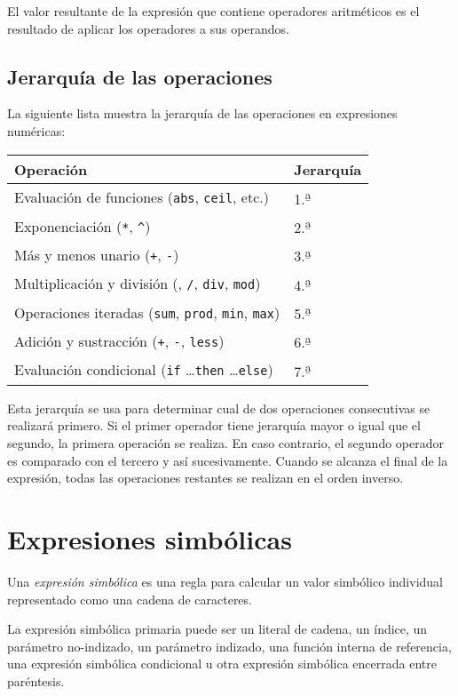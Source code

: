 \documentclass[11pt,spanish]{report}
\begin{document}
El valor resultante de la expresión que contiene operadores aritméticos es el resultado de aplicar los operadores a sus operandos.

\subsection{Jerarquía de las operaciones}
\label{hierarchy}

La siguiente lista muestra la jerarquía de las operaciones en expresiones numéricas:

\noindent\hfil
\begin{tabular}{@{}ll@{}}
Operación&Jerarquía\\
\hline
Evaluación de funciones ({\tt abs}, {\tt ceil}, etc.)&
1.{\textsuperscript{\b{a}}}\\
Exponenciación ({\tt**}, {\tt\textasciicircum})&
2.{\textsuperscript{\b{a}}}\\
Más y menos unario ({\tt+}, {\tt-})&
3.{\textsuperscript{\b{a}}}\\
Multiplicación y división ({\tt*}, {\tt/}, {\tt div}, {\tt mod})&
4.{\textsuperscript{\b{a}}}\\
Operaciones iteradas ({\tt sum}, {\tt prod}, {\tt min}, {\tt max})&
5.{\textsuperscript{\b{a}}}\\
Adición y sustracción ({\tt+}, {\tt-}, {\tt less})&
6.{\textsuperscript{\b{a}}}\\
Evaluación condicional ({\tt if} \dots {\tt then} \dots {\tt else})&
7.{\textsuperscript{\b{a}}}\\
\end{tabular}

Esta jerarquía se usa para determinar cual de dos operaciones consecutivas se realizará primero. Si el primer operador tiene jerarquía mayor o igual que el segundo, la primera operación se realiza. En caso contrario, el segundo operador es comparado con el tercero y así sucesivamente. Cuando se alcanza el final de la expresión, todas las operaciones restantes se realizan en el orden inverso.

\section{Expresiones simbólicas}

Una {\it expresión simbólica} es una regla para calcular un valor simbólico individual representado como una cadena de caracteres.

La expresión simbólica primaria puede ser un literal de cadena, un índice, un parámetro no-indizado, un parámetro indizado, una función interna de referencia, una expresión simbólica condicional u otra expresión simbólica encerrada entre paréntesis.
\end{document}
